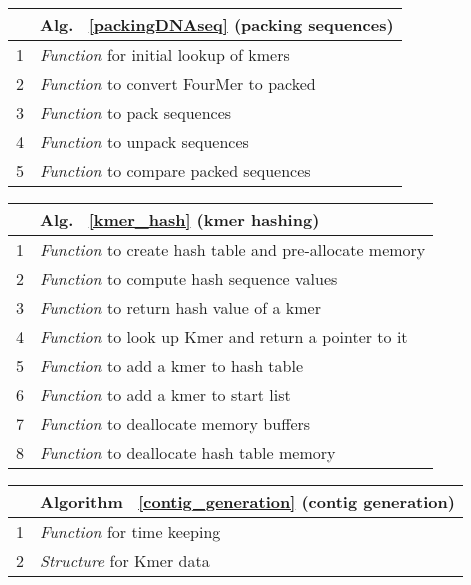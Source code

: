 \documentclass{article}
\begin{document}
\begin{enumerate}
\begin{comment}
Within the serial code, many external functions and variables are referenced which were defined in Algorithms~\ref{packingDNAseq}- ~\ref{contig_generation}. These are displayed below the serial implementation code.
\end{comment}

\begin{table}
    \begin{tabular}[t]{|c|p{3.2cm}|}
        \hline
        &Alg. ~\ref{packingDNAseq} (packing sequences)\\ \hline
        1&\emph{Function} for initial lookup of kmers \\ \hline
        2&\emph{Function} to convert FourMer to packed\\ \hline
        3&\emph{Function} to pack sequences \\ \hline   
        4&\emph{Function} to unpack sequences \\ \hline
        5&\emph{Function} to compare packed sequences \\ \hline   
    \end{tabular}
    \hfill
    \begin{tabular}[t]{|c|p{3.2cm}|}
        \hline
        &Alg. ~\ref{kmer_hash} (kmer hashing)\\ \hline
        1&\emph{Function} to create hash table and pre-allocate memory\\ \hline
        2&\emph{Function} to compute hash sequence values \\ \hline
        3&\emph{Function} to return hash value of a kmer \\ \hline   
        4&\emph{Function} to look up Kmer and return a pointer to it\\ \hline
        5&\emph{Function} to add a kmer to hash table\\ \hline   
        6&\emph{Function} to add a kmer to start list  \\ \hline     
        7&\emph{Function} to deallocate memory buffers\\ \hline     
        8&\emph{Function} to deallocate hash table memory\\ \hline     
    \end{tabular}
    \hfill
    \begin{tabular}[t]{|c|p{3.2cm}|}
        \hline
        &Algorithm ~\ref{contig_generation} (contig generation) \\ \hline
        1&\emph{Function} for time keeping\\ \hline
        2&\emph{Structure} for Kmer data \\ \hline

\end{tabular}
\end{table}
\end{enumerate}
\end{document}
